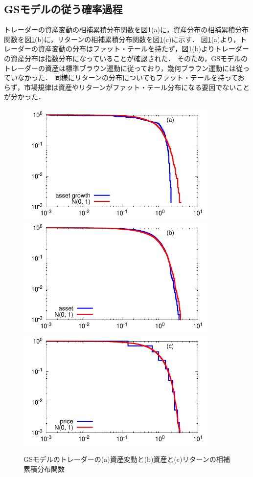 \documentclass[titlepage]{jsreport}
\begin{document}
\subsection{GSモデルの従う確率過程}
トレーダーの資産変動の相補累積分布関数を図\ref{fig:GS_survivalD}(a)に，資産分布の相補累積分布関数を図\ref{fig:GS_survivalD}(b)に，リターンの相補累積分布関数を図\ref{fig:GS_survivalD}(c)に示す．
図\ref{fig:GS_survivalD}(a)より，トレーダーの資産変動の分布はファット・テールを持たず，図\ref{fig:GS_survivalD}(b)よりトレーダーの資産分布は指数分布になっていることが確認された．
そのため，GSモデルのトレーダーの資産は標準ブラウン運動に従っており，幾何ブラウン運動には従っていなかった．
同様にリターンの分布についてもファット・テールを持っておらず，市場規律は資産やリターンがファット・テール分布になる要因でないことが分かった．
\begin{figure}[htbp]
    \centering
    \includegraphics[width=10cm]{fig/Brown/asset_growth_brown.pdf}
    \includegraphics[width=10cm]{fig/Brown/asset_brown.pdf}
    \includegraphics[width=10cm]{fig/Brown/price_brown.pdf}
    \caption{GSモデルのトレーダーの(a)資産変動と(b)資産と(c)リターンの相補累積分布関数}
    \label{fig:GS_survivalD}
\end{figure}
\end{document}
